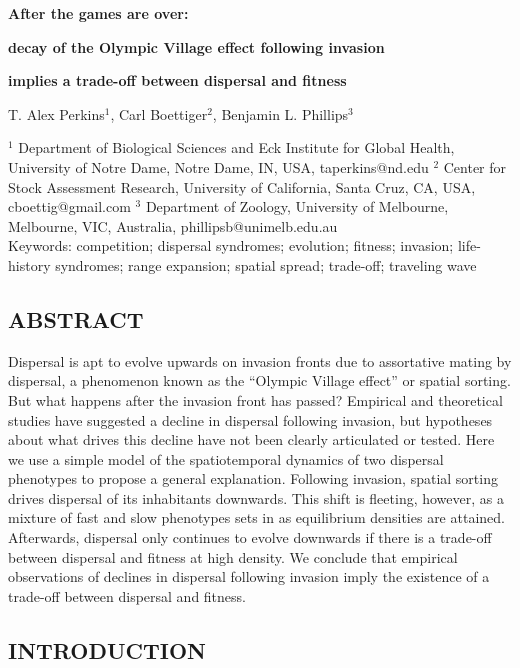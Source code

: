 \documentclass[11pt]{article}
\date{}
\begin{document}
\thispagestyle{empty}
{\Large
\centerline{\textbf{After the games are over: }}
\centerline{\textbf{decay of the Olympic Village effect following invasion}}
\centerline{\textbf{implies a trade-off between dispersal and fitness}}
\vspace{17 pt}

\large
\centerline{T. Alex Perkins$^{1}$, Carl Boettiger$^{2}$, Benjamin L. Phillips$^{3}$}}
\vspace{9 pt}

\begin{flushleft}
$^1$ Department of Biological Sciences and Eck Institute for Global Health, University of Notre Dame, Notre Dame, IN, USA, taperkins@nd.edu
$^2$ Center for Stock Assessment Research, University of California, Santa Cruz, CA, USA, cboettig@gmail.com
$^3$ Department of Zoology, University of Melbourne, Melbourne, VIC, Australia, phillipsb@unimelb.edu.au \\

\vspace{10 pt}
Keywords: competition; dispersal syndromes; evolution; fitness; invasion; life-history syndromes; range expansion; spatial spread; trade-off; traveling wave
\end{flushleft}


\subsection*{ABSTRACT}

Dispersal is apt to evolve upwards on invasion fronts due to assortative mating by dispersal, a phenomenon known as the ``Olympic Village effect'' or spatial sorting. But what happens after the invasion front has passed? Empirical and theoretical studies have suggested a decline in dispersal following invasion, but hypotheses about what drives this decline have not been clearly articulated or tested. Here we use a simple model of the spatiotemporal dynamics of two dispersal phenotypes to propose a general explanation. Following invasion, spatial sorting drives dispersal of its inhabitants downwards. This shift is fleeting, however, as a mixture of fast and slow phenotypes sets in as equilibrium densities are attained. Afterwards, dispersal only continues to evolve downwards if there is a trade-off between dispersal and fitness at high density. We conclude that empirical observations of declines in dispersal following invasion imply the existence of a trade-off between dispersal and fitness.


\subsection*{INTRODUCTION}
\end{document}
